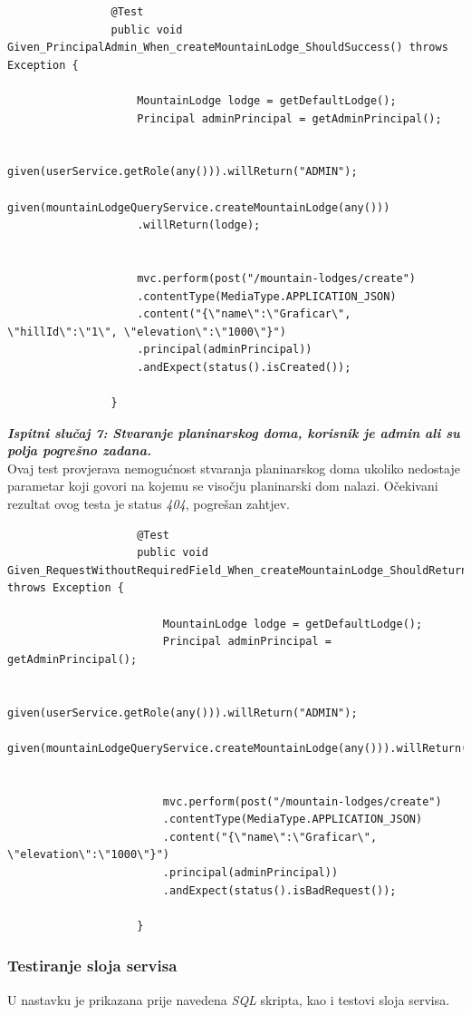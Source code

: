 				
				\begin{lstlisting}
				@Test
				public void Given_PrincipalAdmin_When_createMountainLodge_ShouldSuccess() throws Exception {
					
					MountainLodge lodge = getDefaultLodge();
					Principal adminPrincipal = getAdminPrincipal();
					
					given(userService.getRole(any())).willReturn("ADMIN");
					given(mountainLodgeQueryService.createMountainLodge(any()))
					.willReturn(lodge);
					
					
					mvc.perform(post("/mountain-lodges/create")
					.contentType(MediaType.APPLICATION_JSON)
					.content("{\"name\":\"Graficar\", \"hillId\":\"1\", \"elevation\":\"1000\"}")
					.principal(adminPrincipal))
					.andExpect(status().isCreated());
					
				}
				\end{lstlisting}
			 	\newpage
				\textbf{\textit{Ispitni slučaj 7: Stvaranje planinarskog doma, korisnik je admin ali su polja pogrešno zadana.}}\\
				Ovaj test provjerava nemogućnost stvaranja planinarskog doma ukoliko nedostaje parametar koji govori na kojemu se visočju planinarski dom nalazi.
				Očekivani rezultat ovog testa je status \textit{404}, pogrešan zahtjev.\\
				
				
				\begin{lstlisting}
					@Test
					public void Given_RequestWithoutRequiredField_When_createMountainLodge_ShouldReturnBadRequest() throws Exception {
						
						MountainLodge lodge = getDefaultLodge();
						Principal adminPrincipal = getAdminPrincipal();
						
						given(userService.getRole(any())).willReturn("ADMIN");
						given(mountainLodgeQueryService.createMountainLodge(any())).willReturn(lodge);
						
						
						mvc.perform(post("/mountain-lodges/create")
						.contentType(MediaType.APPLICATION_JSON)
						.content("{\"name\":\"Graficar\", \"elevation\":\"1000\"}")
						.principal(adminPrincipal))
						.andExpect(status().isBadRequest());
						
					}
				\end{lstlisting}\newpage
					
					\subsubsection{Testiranje sloja servisa}
					U nastavku je prikazana prije navedena \textit{SQL} skripta, kao i testovi sloja servisa.
					
